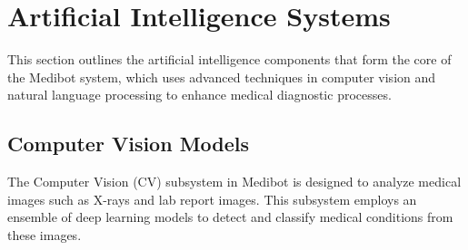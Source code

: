 \section{Artificial Intelligence Systems}

This section outlines the artificial intelligence components that form the core of the Medibot system, which uses advanced techniques in computer vision and natural language processing to enhance medical diagnostic processes.

\subsection{Computer Vision Models}
The Computer Vision (CV) subsystem in Medibot is designed to analyze medical images such as X-rays and lab report images. This subsystem employs an ensemble of deep learning models to detect and classify medical conditions from these images.

